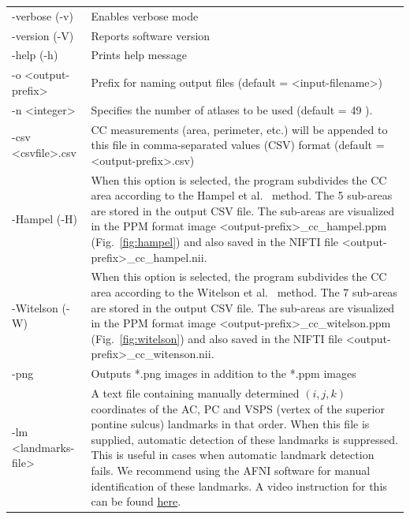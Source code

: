 \documentclass[11pt]{article}
\begin{document}
\begin{longtable}{p{}p{}}
-verbose (-v) & Enables verbose mode \\

-version (-V) &
	Reports software version \\

-help (-h) &
	Prints help message \\

-o \textless output-prefix\textgreater & 
	Prefix for naming output files (default = \textless input-filename\textgreater) \\

-n \textless integer\textgreater & Specifies the number of atlases to be used 
(default = 49 ).\\

-csv \textless csvfile\textgreater.csv & CC measurements (area, perimeter, etc.) will be 
appended to this file in comma-separated values (CSV) format 
(default = \textless output-prefix\textgreater.csv) \\

-Hampel (-H) & When this option is selected, the program subdivides the CC area
according to the Hampel et al.\ \citep{Hampel1998-fz} method. The 5 sub-areas are stored
in the output CSV file. The sub-areas are visualized in the PPM format image
\textless output-prefix\textgreater\_cc\_hampel.ppm
(Fig.\ \ref{fig:hampel}) and also saved in the NIFTI file
\textless output-prefix\textgreater\_cc\_hampel.nii.\\

-Witelson (-W) & When this option is selected, the program subdivides the CC area
according to the Witelson et al.\ \citep{Narayan2016-es} method. The 7 sub-areas are stored
in the output CSV file. The sub-areas are visualized in the PPM format image
\textless output-prefix\textgreater\_cc\_witelson.ppm
(Fig.\ \ref{fig:witelson}) and also saved in the NIFTI file
\textless output-prefix\textgreater\_cc\_witenson.nii.\\

-png & Outputs *.png images in addition to the *.ppm images \\

-lm \textless landmarks-file\textgreater &
A text file containing manually determined $(i, j, k)$ coordinates
of the AC, PC and VSPS (vertex of the superior pontine sulcus) landmarks in that order. 
When this file is supplied,
automatic detection of these landmarks is suppressed. This is useful
in cases when automatic landmark detection fails.
We recommend using the AFNI software for manual identification of these landmarks.
A video instruction for this can be found
\href{https://www.youtube.com/watch?v=q5GBaNnjOa8}{\underline{here}}.
\\


\end{longtable}
\end{document}
